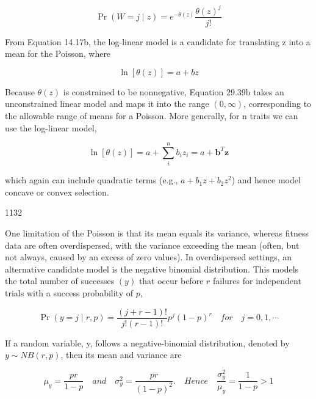 \documentclass{article}
\begin{document}
\begin{equation}
\Pr(W=j\mid z)=e^{-\theta(z)}\frac{\theta(z)^{j}}{j!}
\tag{29.39a}
\label{eq:29_39a}
\end{equation}

From Equation 14.17b, the log-linear model is a candidate for translating z into a mean for the Poisson, where

\begin{equation}
\ln[\theta(z)]=a+b z
\tag{29.39b}
\label{eq:29_39b}
\end{equation}

Because  $ \theta(z) $ is constrained to be nonnegative, Equation 29.39b takes an unconstrained linear model and maps it into the range  $ (0,\infty) $, corresponding to the allowable range of means for a Poisson. More generally, for n traits we can use the log-linear model,

\begin{equation}
\ln[\theta(z)]=a+\sum_{i}^{n}b_{i}z_{i}=a+\mathbf{b}^{T}\mathbf{z}
\tag{29.39c}
\label{eq:29_39c}
\end{equation}

which again can include quadratic terms (e.g.,  $ a + b_{1}z + b_{2}z^{2} $) and hence model concave or convex selection.

1132

One limitation of the Poisson is that its mean equals its variance, whereas fitness data are often overdispersed, with the variance exceeding the mean (often, but not always, caused by an excess of zero values). In overdispersed settings, an alternative candidate model is the negative binomial distribution. This models the total number of successes  $ (y) $ that occur before  $ r $ failures for independent trials with a success probability of  $ p $,

\begin{equation}
\Pr(y=j\mid r,p)=\frac{(j+r-1)!}{j!(r-1)!}p^{j}(1-p)^{r}\quad for\quad j=0,1,\cdots
\tag{29.40a}
\label{eq:29_40a}
\end{equation}

If a random variable, y, follows a negative-binomial distribution, denoted by  $ y \sim NB(r, p) $, then its mean and variance are

\begin{equation}
\mu_{y}=\frac{pr}{1-p}\quad and\quad\sigma_{y}^{2}=\frac{pr}{(1-p)^{2}}.\quad Hence\quad\frac{\sigma_{y}^{2}}{\mu_{y}}=\frac{1}{1-p}>1
\tag{29.40b}
\label{eq:29_40b}
\end{equation}
\end{document}
